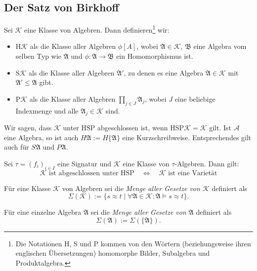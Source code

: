 
\subsection{Der Satz von Birkhoff}

\begin{samepage}    
\begin{definition}
    Sei $\mathcal{K}$ eine Klasse von Algebren. Dann definieren\footnote{Die Notationen \glqq H\grqq{}, \glqq S\grqq{} und \glqq{}P\grqq{} kommen von den Wörtern (beziehungsweise ihren englischen Übersetzungen) \glqq homomorphe Bilder\grqq{}, \glqq Subalgebra\grqq{} und \glqq Produktalgebra\grqq{}.} wir:
    \begin{itemize}
        \item $\mathrm{H}\mathcal{K}$ als die Klasse aller Algebren $\phi[A]$, wobei $\mathfrak{A}\in\mathcal{K}$, $\mathfrak{B}$ eine Algebra vom selben Typ wie $\mathfrak{A}$ und $\phi:\mathfrak{A}\to \mathfrak{B}$ ein Homomorphismus ist.
        \item $\mathrm{S}\mathcal{K}$ als die Klasse aller Algebren $\mathfrak{A}'$, zu denen es eine Algebra $\mathfrak{A} \in \mathcal{K}$ mit $\mathfrak{A}' \leq \mathfrak{A}$ gibt.
        \item $\mathrm{P}\mathcal{K}$ als die Klasse aller Algebren $\prod_{j \in J} \mathfrak{A}_j$, wobei $J$ eine beliebige Indexmenge und alle $\mathfrak{A}_j \in \mathcal{K}$ sind.
    \end{itemize}
    Wir sagen, dass $\mathcal{K}$ unter $\mathrm{HSP}$ abgeschlossen ist, wenn $\mathrm{HSP}\mathcal{K} = \mathcal{K}$ gilt. Ist $\mathcal{A}$ eine Algebra, so ist auch $H\mathfrak{A}:=H\{\mathfrak{A}\}$ eine Kurzschreibweise. Entsprechendes gilt auch für $S\mathfrak{A}$ und $P\mathfrak{A}$.
\end{definition}
\end{samepage}

\begin{theorem}[Birkhoff]
    Sei $\tau=(f_i)_{i\in I}$ eine Signatur und $\mathcal{K}$ eine Klasse von $\tau$-Algebren. Dann gilt:
    \[\mathcal{K} \text{ ist abgeschlossen unter } \mathrm{HSP} \quad \Leftrightarrow \quad \mathcal{K} \text{ ist eine Varietät} \]
\end{theorem}

\begin{definition}
    Für eine Klasse $\mathcal{K}$ von Algebren sei die \emph{Menge aller Gesetze von $\mathcal{K}$} definiert als
    $$\Sigma(\mathcal{K}):=\{s\approx t\mid \forall \mathfrak{A}\in\mathcal{K}:\mathfrak{A}\models s\approx t\}.$$

    Für eine einzelne Algebra $\mathfrak{A}$ sei die \emph{Menge aller Gesetze von $\mathfrak{A}$} definiert als 
    $$\Sigma(\mathfrak{A}) := \Sigma(\{\mathfrak{A}\}).$$ 
\end{definition}

